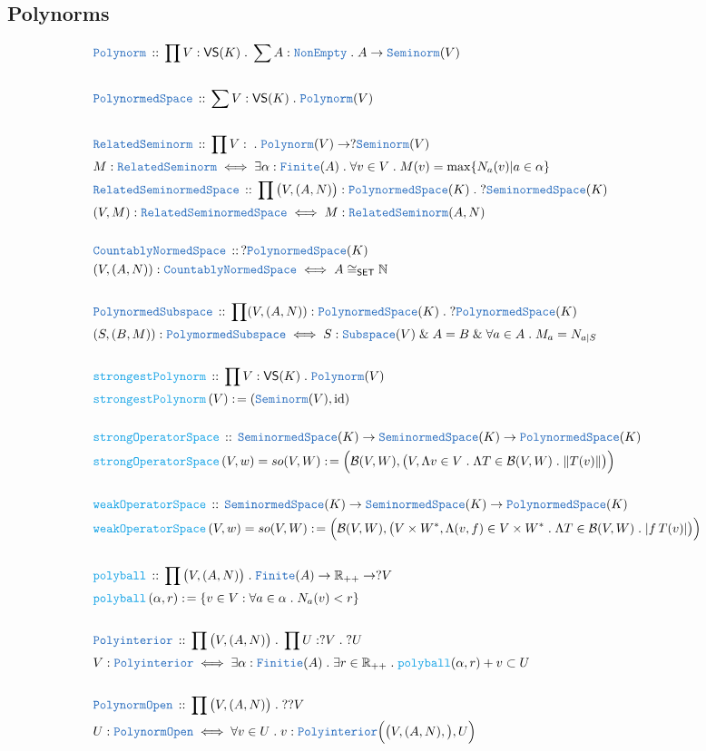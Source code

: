 \documentclass[12pt]{scrartcl}
\newcommand{\TYPE}[1]{\textcolor{NavyBlue}{\mathtt{#1}}}
\newcommand{\FUNC}[1]{\textcolor{Cerulean}{\mathtt{#1}}}
\renewcommand{\.}{\; . \;}
\newcommand{\de}{: \kern 0.1pc =}
\newcommand{\Act}[1]{\left( #1 \right)}
\newcommand{\DeclareType}[2]{& \TYPE{#1} \, :: \, #2 \\}
\newcommand{\DefineType}[3]{& #1 : \TYPE{#2} \iff #3 \\}
\newcommand{\DeclareFunc}[2]{& \FUNC{#1} \, :: \, #2 \\}
\newcommand{\DefineFunc}[3]{&  \FUNC{#1}\Act{#2} \de #3 \\}
\newcommand{\DefineNamedFunc}[4]{&  \FUNC{#1}\Act{#2} = #3 \de #4 \\}
\newcommand{\Page}[1]{\begin{align*} #1 \end{align*} \newpage   }
\renewcommand{\And}{\; \& \;}
\newcommand{\Reals}{\mathbb{R} }
\newcommand{\Nat}{\mathbb{N} }
\DeclareMathOperator*{\id}{id}
\newcommand{\SNS}{\TYPE{SeminormedSpace}}
\newcommand{\PNS}{\TYPE{PolynormedSpace}}
\newcommand{\B}{\mathcal{B}}
\begin{document}
\subsection{Polynorms}
\Page{
	\DeclareType{Polynorm}{ \prod V : \mathsf{VS}(K) \. \sum A : \TYPE{NonEmpty} \. A \to \TYPE{Seminorm}(V)} \\
 \DeclareType{PolynormedSpace}{ \sum V : \mathsf{VS}(K) \. \TYPE{Polynorm}(V)  } \\
 \DeclareType{RelatedSeminorm}{ \prod V : \mathsf \. \TYPE{Polynorm}(V) \to ?\TYPE{Seminorm}(V) }
 \DefineType{M}{RelatedSeminorm}{ \exists \alpha : \TYPE{Finite}(A) \. \forall v \in V \.  M(v) = \max\{ N_a(v) | a \in \alpha  \} }
 \DeclareType{RelatedSeminormedSpace}{ \prod \big(V,(A,N)\big) : \TYPE{PolynormedSpace}(K) \. ?\SNS(K)}
 \DefineType{(V,M)}{RelatedSeminormedSpace}{ M : \TYPE{RelatedSeminorm}(A,N)} \\
 \DeclareType{ CountablyNormedSpace }{ ?\TYPE{PolynormedSpace}(K) }
 \DefineType{(V,(A,N))}{CountablyNormedSpace}{A \cong_{\mathsf{SET}} \Nat} \\
 \DeclareType{PolynormedSubspace}{ \prod (V,(A,N)) : \PNS(K) \. ? \PNS(K)}
 \DefineType{(S,(B,M))}{PolymormedSubspace}{ S : \TYPE{Subspace}(V) \And A = B \And \forall a \in A \. M_a = N_{a|S} }
 \\
 \DeclareFunc{strongestPolynorm}{ \prod V  : \mathsf{VS}(K) \. \TYPE{Polynorm}(V) }
 \DefineFunc{strongestPolynorm}{ V }{ ( \TYPE{Seminorm}(V), \id  )} \\
 \DeclareFunc{strongOperatorSpace}{ \SNS(K) \to \SNS(K) \to \PNS(K)}
 \DefineNamedFunc{strongOperatorSpace}{V,w}{so(V,W)}{\Big(\B(V,W), \big(V, \Lambda v \in V \. \Lambda T \in \B(V,W) \. \|T(v) \| \big) \Big)}\\ 
 \DeclareFunc{weakOperatorSpace}{ \SNS(K) \to \SNS(K) \to \PNS(K)}
 \DefineNamedFunc{weakOperatorSpace}{V,w}{so(V,W)}{\Big(\B(V,W), \big(V \times W^*, \Lambda (v,f) \in V \times W^* \. \Lambda T \in \B(V,W) \. |f \, T(v)| \big) \Big)}\\
 \DeclareFunc{polyball}{ \prod \big( V, (A,N) \big) \. \TYPE{Finite}(A) \to \Reals_{++} \to ?V }
 \DefineFunc{polyball}{\alpha,r}{ \{  v \in V : \forall a \in \alpha \.  N_a(v) < r \} } \\
 \DeclareType{Polyinterior}{ \prod \big(V, (A,N) \big) \. \prod U : ?V \. ?U}
 \DefineType{V}{Polyinterior}{ \exists \alpha : \TYPE{Finitie}(A) \. \exists r \in \Reals_{++} \. \FUNC{polyball}(\alpha,r) + v \subset U  } \\
 \DeclareType{PolynormOpen}{\prod \big(V, (A,N) \big) \.  ?? V }
 \DefineType{U}{PolynormOpen}{ \forall v \in U \. v : \TYPE{Polyinterior}\Big( \big(V,(A,N),\big),U \Big) } \\
}
\end{document}
